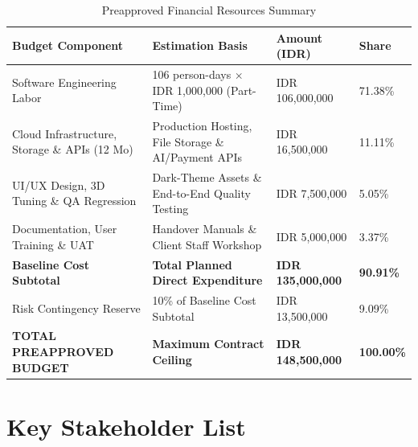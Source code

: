 \documentclass[11pt,a4paper]{article}
\newcommand{\thdr}[1]{\centering\arraybackslash\textbf{#1}}
\renewcommand{\arraystretch}{1.26}
\begin{document}
\vspace{-4pt}
\begin{table}[H]
\centering
{\renewcommand{\arraystretch}{1.12}\small
\caption{Preapproved Financial Resources Summary}
\begin{tabularx}{\textwidth}{| L{5.4cm} | Y | R{3.3cm} | C{1.5cm} |}
\hline
{} \thdr{Budget Component} & \thdr{Estimation Basis} & \thdr{Amount (IDR)} & \thdr{Share} \\
\hline
Software Engineering Labor & 106 person-days $\times$ IDR 1,000,000 (Part-Time) & IDR 106,000,000 & 71.38\% \\
\hline
Cloud Infrastructure, Storage \& APIs (12 Mo) & Production Hosting, File Storage \& AI/Payment APIs & IDR 16,500,000 & 11.11\% \\
\hline
UI/UX Design, 3D Tuning \& QA Regression & Dark-Theme Assets \& End-to-End Quality Testing & IDR 7,500,000 & 5.05\% \\
\hline
Documentation, User Training \& UAT & Handover Manuals \& Client Staff Workshop & IDR 5,000,000 & 3.37\% \\
\hline
{} \textbf{Baseline Cost Subtotal} & \textbf{Total Planned Direct Expenditure} & \textbf{IDR 135,000,000} & \textbf{90.91\%} \\
\hline
Risk Contingency Reserve & 10\% of Baseline Cost Subtotal & IDR 13,500,000 & 9.09\% \\
\hline
{} \textbf{TOTAL PREAPPROVED BUDGET} & \textbf{Maximum Contract Ceiling} & \textbf{IDR 148,500,000} & \textbf{100.00\%} \\
\hline
\end{tabularx}}
\end{table}

\vspace{-4pt}
\section{Key Stakeholder List}
\end{document}
